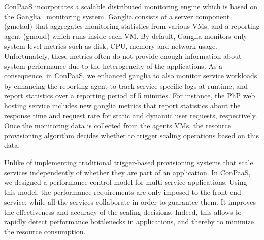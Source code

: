 ConPaaS incorporates a scalable distributed monitoring engine which is based on the Ganglia~\cite{ganglia} monitoring system. Ganglia consists of a server component (gmetad) that aggregates monitoring statistics from various VMs, and a reporting agent (gmond) which runs inside each VM. By default, Ganglia monitors only system-level metrics such as disk, CPU, memory and network usage. Unfortunately, these metrics often do not provide enough information about system performance due to the heterogeneity of the applications. As a consequence, in ConPaaS, we enhanced ganglia to also monitor service workloads by enhancing the reporting agent to track service-specific logs at runtime, and report statistics over a reporting period of 5 minutes. For instance, the PhP web hosting service includes new ganglia metrics that report statistics about the response time and request rate for static and dynamic user requests, respectively. Once the monitoring data is collected from the agents VMs, the resource provisioning  algorithm decides whether to trigger scaling operations based on this data. 

Unlike of implementing traditional trigger-based provisioning systems that scale services independently of whether they are part of an application. In ConPaaS, we designed a performance control model for multi-service applications. Using this model, the performance requirements are only imposed to the front-end service, while all the services collaborate in order to guarantee them. It improves the effectiveness and accuracy of the scaling decisions. Indeed, this allows to rapidly detect performance bottlenecks in applications, and thereby to minimize the resource consumption.




 

